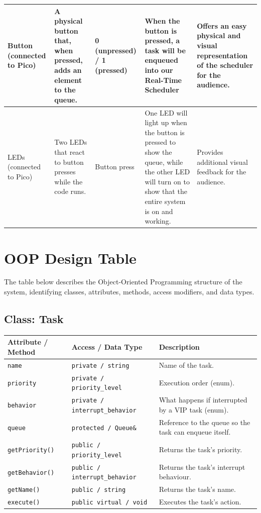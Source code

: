 \documentclass[12pt]{article}
\begin{document}
\begin{longtable}{P{2.8cm} P{3.2cm} P{2.2cm} P{2.8cm} P{3cm}}
Button (connected to Pico)
& A physical button that, when pressed, adds an element to the queue.
& 0 (unpressed) / 1 (pressed)
& When the button is pressed, a task will be enqueued into our Real-Time Scheduler
& Offers an easy physical and visual representation of the scheduler for
  the audience. \\
\midrule

LEDs (connected to Pico)
& Two LEDs that react to button presses while the code runs.
& Button press
& One LED will light up when the button is pressed to show the queue, while the other LED will turn on to show that the entire system is on and working. 
& Provides additional visual feedback for the audience. \\
\bottomrule
\end{longtable}

\newpage

\section*{OOP Design Table}

The table below describes the Object-Oriented Programming structure of the
system, identifying classes, attributes, methods, access modifiers, and
data types.

\subsection*{Class: Task}

\begin{longtable}{P{3.5cm} P{3.5cm} P{7cm}}
\toprule
\textbf{Attribute / Method} & \textbf{Access / Data Type} & \textbf{Description} \\
\midrule
\endhead

\texttt{name}       & \texttt{private / string}             & Name of the task. \\
\texttt{priority}   & \texttt{private / priority\_level}    & Execution order (enum). \\
\texttt{behavior}   & \texttt{private / interrupt\_behavior}& What happens if interrupted by a VIP task (enum). \\
\texttt{queue}      & \texttt{protected / Queue\&}          & Reference to the queue so the task can enqueue itself. \\
\texttt{getPriority()} & \texttt{public / priority\_level}  & Returns the task's priority. \\
\texttt{getBehavior()} & \texttt{public / interrupt\_behavior} & Returns the task's interrupt behaviour. \\
\texttt{getName()}  & \texttt{public / string}              & Returns the task's name. \\
\texttt{execute()}  & \texttt{public virtual / void}        & Executes the task's action. \\
\bottomrule
\end{longtable}
\end{document}
